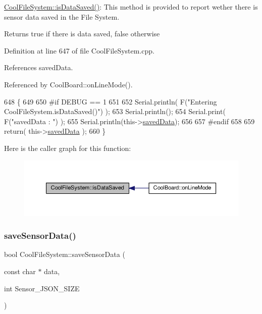 \hyperlink{classCoolFileSystem_a5a7eaeea7a9fbf8aaef651d862fa3b5b}{Cool\+File\+System\+::is\+Data\+Saved()}\+: This method is provided to report wether there is sensor data saved in the File System.

\begin{DoxyReturn}{Returns}
true if there is data saved, false otherwise 
\end{DoxyReturn}


Definition at line 647 of file Cool\+File\+System.\+cpp.



References saved\+Data.



Referenced by Cool\+Board\+::on\+Line\+Mode().


\begin{DoxyCode}
648 \{
649 
650 \textcolor{preprocessor}{#if DEBUG == 1 }
651 
652     Serial.println( F(\textcolor{stringliteral}{"Entering CoolFileSystem.isDataSaved()"}) );
653     Serial.println();
654     Serial.print( F(\textcolor{stringliteral}{"savedData : "}) );
655     Serial.println(this->\hyperlink{classCoolFileSystem_ad398e0c5c41a0c88acdf5d672aa71351}{savedData});
656 
657 \textcolor{preprocessor}{#endif}
658 
659     \textcolor{keywordflow}{return}( this->\hyperlink{classCoolFileSystem_ad398e0c5c41a0c88acdf5d672aa71351}{savedData} );
660 \}
\end{DoxyCode}
Here is the caller graph for this function\+:\nopagebreak
\begin{figure}[H]
\begin{center}
\leavevmode
\includegraphics[width=350pt]{classCoolFileSystem_a5a7eaeea7a9fbf8aaef651d862fa3b5b_icgraph}
\end{center}
\end{figure}
\mbox{\label{classCoolFileSystem_a4c560c2ddd40b74b7758e6ceb2c58957}} 
\subsubsection{\texorpdfstring{save\+Sensor\+Data()}{saveSensorData()}}
{\footnotesize\ttfamily bool Cool\+File\+System\+::save\+Sensor\+Data (\begin{DoxyParamCaption}\item[{const char $\ast$}]{data,  }\item[{int}]{Sensor\+\_\+\+J\+S\+O\+N\+\_\+\+S\+I\+ZE }\end{DoxyParamCaption})}

